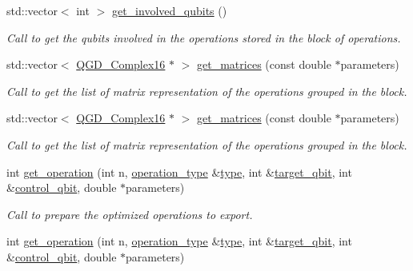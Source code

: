 \begin{DoxyCompactItemize}
std\+::vector$<$ int $>$ \hyperlink{class_operation__block_aebdbb71e02ff6826d967d55f4cd4db28}{get\+\_\+involved\+\_\+qubits} ()
\begin{DoxyCompactList}\small\item\em Call to get the qubits involved in the operations stored in the block of operations. \end{DoxyCompactList}\item 
std\+::vector$<$ \hyperlink{struct_q_g_d___complex16}{Q\+G\+D\+\_\+\+Complex16} $\ast$ $>$ \hyperlink{class_operation__block_aedddbc5242eab7c00125359a835ac53d}{get\+\_\+matrices} (const double $\ast$parameters)
\begin{DoxyCompactList}\small\item\em Call to get the list of matrix representation of the operations grouped in the block. \end{DoxyCompactList}\item 
std\+::vector$<$ \hyperlink{struct_q_g_d___complex16}{Q\+G\+D\+\_\+\+Complex16} $\ast$ $>$ \hyperlink{class_operation__block_af3e794fd9a409978a414af539ad23320}{get\+\_\+matrices} (const double $\ast$parameters)
\begin{DoxyCompactList}\small\item\em Call to get the list of matrix representation of the operations grouped in the block. \end{DoxyCompactList}\item 
int \hyperlink{class_decomposition___base_a64e2b692d38fe3ccbd49708d8fa24493}{get\+\_\+operation} (int n, \hyperlink{operations_2include_2_operation_8h_ad99e62941c8e4b13e5fc45ecaaf65eff}{operation\+\_\+type} \&\hyperlink{class_operation_ad47c56c86d62a4c775571e1600416479}{type}, int \&\hyperlink{class_operation_a3e489b72c124b494777c71b1646bb1e9}{target\+\_\+qbit}, int \&\hyperlink{class_operation_a9a798ea8adec5a45fd2ca07996da88e1}{control\+\_\+qbit}, double $\ast$parameters)
\begin{DoxyCompactList}\small\item\em Call to prepare the optimized operations to export. \end{DoxyCompactList}\item 
int \hyperlink{class_decomposition___base_a64e2b692d38fe3ccbd49708d8fa24493}{get\+\_\+operation} (int n, \hyperlink{operations_2include_2_operation_8h_ad99e62941c8e4b13e5fc45ecaaf65eff}{operation\+\_\+type} \&\hyperlink{class_operation_ad47c56c86d62a4c775571e1600416479}{type}, int \&\hyperlink{class_operation_a3e489b72c124b494777c71b1646bb1e9}{target\+\_\+qbit}, int \&\hyperlink{class_operation_a9a798ea8adec5a45fd2ca07996da88e1}{control\+\_\+qbit}, double $\ast$parameters)

\end{DoxyCompactItemize}
